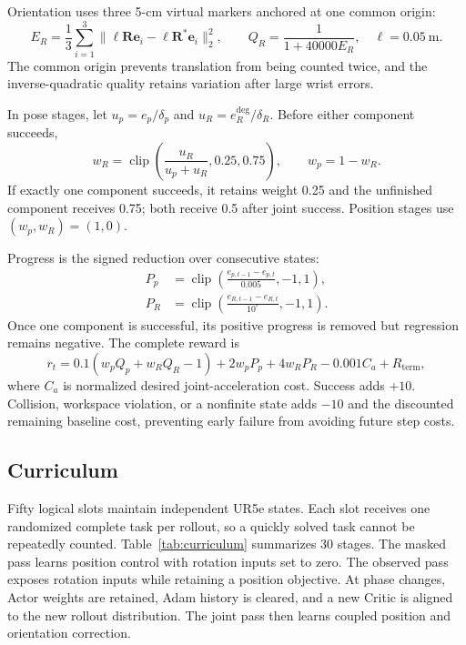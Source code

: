 \documentclass[conference]{IEEEtran}
\begin{document}
Orientation uses three 5-cm virtual markers anchored at one common origin:
\begin{equation}
E_R=\frac{1}{3}\sum_{i=1}^{3}
\|\ell\mathbf R\mathbf e_i-\ell\mathbf R^*\mathbf e_i\|_2^2,
\qquad
Q_R=\frac{1}{1+40000E_R},
\quad \ell=0.05\ \mathrm m.
\label{eq:orientation_quality}
\end{equation}
The common origin prevents translation from being counted twice, and the inverse-quadratic quality retains variation after large wrist errors.

In pose stages, let $u_p=e_p/\delta_p$ and
$u_R=e_R^{\mathrm{deg}}/\delta_R$. Before either component succeeds,
\begin{equation}
w_R=\operatorname{clip}
\left(\frac{u_R}{u_p+u_R},0.25,0.75\right),
\qquad w_p=1-w_R.
\label{eq:weights}
\end{equation}
If exactly one component succeeds, it retains weight 0.25 and the unfinished component receives 0.75; both receive 0.5 after joint success. Position stages use $(w_p,w_R)=(1,0)$.

Progress is the signed reduction over consecutive states:
\begin{align}
P_p&=\operatorname{clip}
\left(\frac{e_{p,t-1}-e_{p,t}}{0.005},-1,1\right),\nonumber\\
P_R&=\operatorname{clip}
\left(\frac{e_{R,t-1}-e_{R,t}}{10^{\circ}},-1,1\right).
\label{eq:progress}
\end{align}
Once one component is successful, its positive progress is removed but regression remains negative. The complete reward is
\begin{equation}
r_t=0.1(w_pQ_p+w_RQ_R-1)
+2w_pP_p+4w_RP_R-0.001C_a+R_{\mathrm{term}},
\label{eq:reward}
\end{equation}
where $C_a$ is normalized desired joint-acceleration cost. Success adds $+10$. Collision, workspace violation, or a nonfinite state adds $-10$ and the discounted remaining baseline cost, preventing early failure from avoiding future step costs.

\subsection{Curriculum}

Fifty logical slots maintain independent UR5e states. Each slot receives one randomized complete task per rollout, so a quickly solved task cannot be repeatedly counted. Table~\ref{tab:curriculum} summarizes 30 stages. The masked pass learns position control with rotation inputs set to zero. The observed pass exposes rotation inputs while retaining a position objective. At phase changes, Actor weights are retained, Adam history is cleared, and a new Critic is aligned to the new rollout distribution. The joint pass then learns coupled position and orientation correction.
\end{document}
